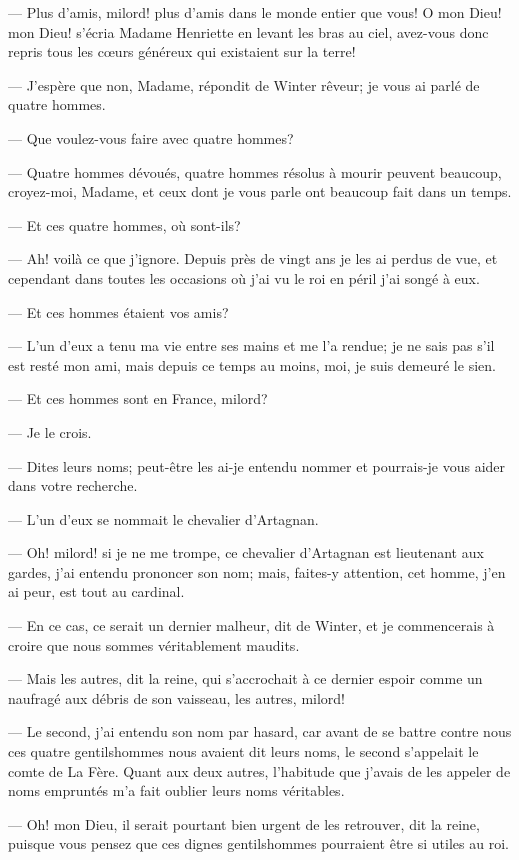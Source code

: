 — Plus d'amis, milord! plus d'amis dans le monde entier que vous! O mon Dieu! mon Dieu! s'écria Madame Henriette en levant les bras au ciel, avez-vous donc repris tous les cœurs généreux qui existaient sur la terre!

— J'espère que non, Madame, répondit de Winter rêveur; je vous ai parlé de quatre hommes.

— Que voulez-vous faire avec quatre hommes?

— Quatre hommes dévoués, quatre hommes résolus à mourir peuvent beaucoup, croyez-moi, Madame, et ceux dont je vous parle ont beaucoup fait dans un temps.

— Et ces quatre hommes, où sont-ils?

— Ah! voilà ce que j'ignore. Depuis près de vingt ans je les ai perdus de vue, et cependant dans toutes les occasions où j'ai vu le roi en péril j'ai songé à eux.

— Et ces hommes étaient vos amis?

— L'un d'eux a tenu ma vie entre ses mains et me l'a rendue; je ne sais pas s'il est resté mon ami, mais depuis ce temps au moins, moi, je suis demeuré le sien.

— Et ces hommes sont en France, milord?

— Je le crois.

— Dites leurs noms; peut-être les ai-je entendu nommer et pourrais-je vous aider dans votre recherche.

— L'un d'eux se nommait le chevalier d'Artagnan.

— Oh! milord! si je ne me trompe, ce chevalier d'Artagnan est lieutenant aux gardes, j'ai entendu prononcer son nom; mais, faites-y attention, cet homme, j'en ai peur, est tout au cardinal.

— En ce cas, ce serait un dernier malheur, dit de Winter, et je commencerais à croire que nous sommes véritablement maudits.

— Mais les autres, dit la reine, qui s'accrochait à ce dernier espoir comme un naufragé aux débris de son vaisseau, les autres, milord!

— Le second, j'ai entendu son nom par hasard, car avant de se battre contre nous ces quatre gentilshommes nous avaient dit leurs noms, le second s'appelait le comte de La Fère. Quant aux deux autres, l'habitude que j'avais de les appeler de noms empruntés m'a fait oublier leurs noms véritables.

— Oh! mon Dieu, il serait pourtant bien urgent de les retrouver, dit la reine, puisque vous pensez que ces dignes gentilshommes pourraient être si utiles au roi.


